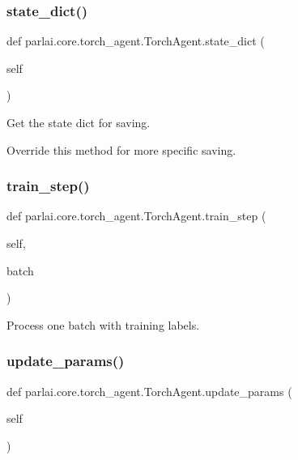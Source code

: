 \subsubsection{\texorpdfstring{state\+\_\+dict()}{state\_dict()}}
{\footnotesize\ttfamily def parlai.\+core.\+torch\+\_\+agent.\+Torch\+Agent.\+state\+\_\+dict (\begin{DoxyParamCaption}\item[{}]{self }\end{DoxyParamCaption})}

\begin{DoxyVerb}Get the state dict for saving.

Override this method for more specific saving.
\end{DoxyVerb}
 \mbox{\label{classparlai_1_1core_1_1torch__agent_1_1TorchAgent_a8ba9d535736c0af100d00c5e7b02b61b}} 
\subsubsection{\texorpdfstring{train\+\_\+step()}{train\_step()}}
{\footnotesize\ttfamily def parlai.\+core.\+torch\+\_\+agent.\+Torch\+Agent.\+train\+\_\+step (\begin{DoxyParamCaption}\item[{}]{self,  }\item[{}]{batch }\end{DoxyParamCaption})}

\begin{DoxyVerb}[Abstract] Process one batch with training labels.
\end{DoxyVerb}
 \mbox{\label{classparlai_1_1core_1_1torch__agent_1_1TorchAgent_a7e2c9e180887397daa6229a0f9700b1c}} 
\subsubsection{\texorpdfstring{update\+\_\+params()}{update\_params()}}
{\footnotesize\ttfamily def parlai.\+core.\+torch\+\_\+agent.\+Torch\+Agent.\+update\+\_\+params (\begin{DoxyParamCaption}\item[{}]{self }\end{DoxyParamCaption})}

